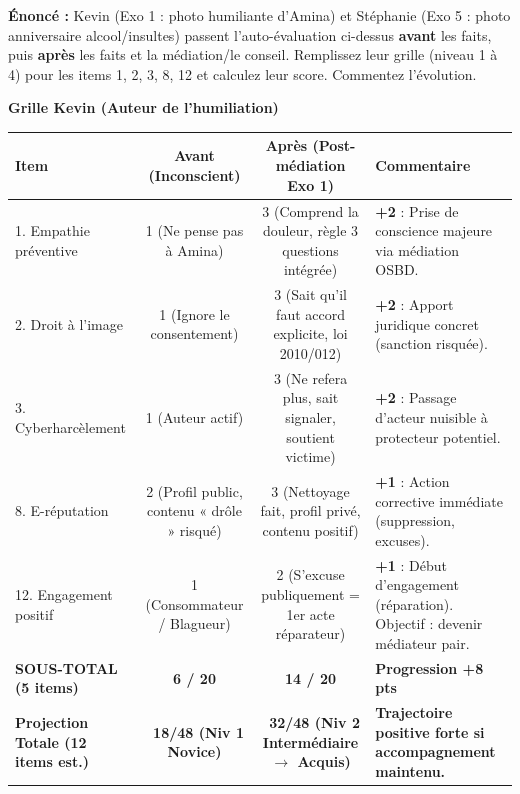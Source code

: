 \documentclass[11pt]{article}
\begin{document}
\begin{exoresolu}
\textbf{Énoncé :} Kevin (Exo 1 : photo humiliante d'Amina) et Stéphanie (Exo 5 : photo anniversaire alcool/insultes) passent l'auto-évaluation ci-dessus \textbf{avant} les faits, puis \textbf{après} les faits et la médiation/le conseil. Remplissez leur grille (niveau 1 à 4) pour les items 1, 2, 3, 8, 12 et calculez leur score. Commentez l'évolution.

\tcblower
\textbf{Grille Kevin (Auteur de l'humiliation)}

\begin{center}
\begin{tabularx}{\linewidth}{|l|c|c|X|}
\hline
\textbf{Item} & \textbf{Avant (Inconscient)} & \textbf{Après (Post-médiation Exo 1)} & \textbf{Commentaire} \\
\hline
1. Empathie préventive & 1 (Ne pense pas à Amina) & 3 (Comprend la douleur, règle 3 questions intégrée) & \textbf{+2} : Prise de conscience majeure via médiation OSBD. \\
\hline
2. Droit à l'image & 1 (Ignore le consentement) & 3 (Sait qu'il faut accord explicite, loi 2010/012) & \textbf{+2} : Apport juridique concret (sanction risquée). \\
\hline
3. Cyberharcèlement & 1 (Auteur actif) & 3 (Ne refera plus, sait signaler, soutient victime) & \textbf{+2} : Passage d'acteur nuisible à protecteur potentiel. \\
\hline
8. E-réputation & 2 (Profil public, contenu « drôle » risqué) & 3 (Nettoyage fait, profil privé, contenu positif) & \textbf{+1} : Action corrective immédiate (suppression, excuses). \\
\hline
12. Engagement positif & 1 (Consommateur / Blagueur) & 2 (S'excuse publiquement = 1er acte réparateur) & \textbf{+1} : Début d'engagement (réparation). Objectif : devenir médiateur pair. \\
\hline
\textbf{SOUS-TOTAL (5 items)} & \textbf{6 / 20} & \textbf{14 / 20} & \textbf{Progression +8 pts} \\
\hline
\textbf{Projection Totale (12 items est.)} & \textbf{~18/48 (Niv 1 Novice)} & \textbf{~32/48 (Niv 2 Intermédiaire $\rightarrow$ Acquis)} & \textbf{Trajectoire positive forte si accompagnement maintenu.} \\
\hline
\end{tabularx}
\end{center}


\end{exoresolu}
\end{document}
